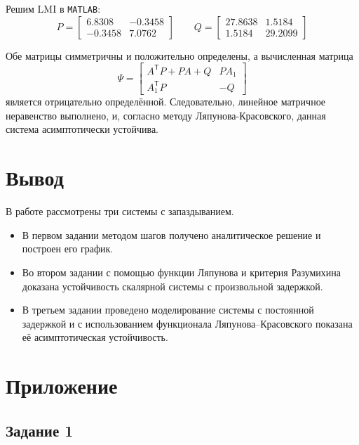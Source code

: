 \documentclass[a4paper,12pt]{article}
\begin{document}
	Решим LMI в \texttt{MATLAB}:
	\[
	P =
	\begin{bmatrix}
		6.8308 & -0.3458\\
		-0.3458 & 7.0762
	\end{bmatrix}
	\qquad
	Q =
	\begin{bmatrix}
		27.8638 & 1.5184\\
		1.5184 & 29.2099
	\end{bmatrix}
	\]
	
	Обе матрицы симметричны и положительно определены, а вычисленная матрица
	\[
	\Psi =
	\begin{bmatrix}
		A^{\mathsf T}P + PA + Q & PA_1\\
		A_1^{\mathsf T}P & -Q
	\end{bmatrix}
	\]
	является отрицательно определённой. Следовательно, линейное матричное
	неравенство выполнено, и, согласно методу Ляпунова-Красовского,
	данная система асимптотически устойчива.
	
	\newpage
	\section{Вывод}
	
	В работе рассмотрены три системы с запаздыванием. 
	
	\begin{itemize}
		\item В первом задании методом шагов получено аналитическое решение и построен его график.
		\item  Во втором задании с помощью функции Ляпунова и критерия Разумихина доказана устойчивость скалярной системы с произвольной задержкой.
		\item  В третьем задании проведено моделирование системы с постоянной задержкой и с использованием функционала Ляпунова–Красовского показана её асимптотическая устойчивость.
	\end{itemize}
	
	\newpage
	\section{Приложение}
	
	\subsection*{Задание 1}
\end{document}
